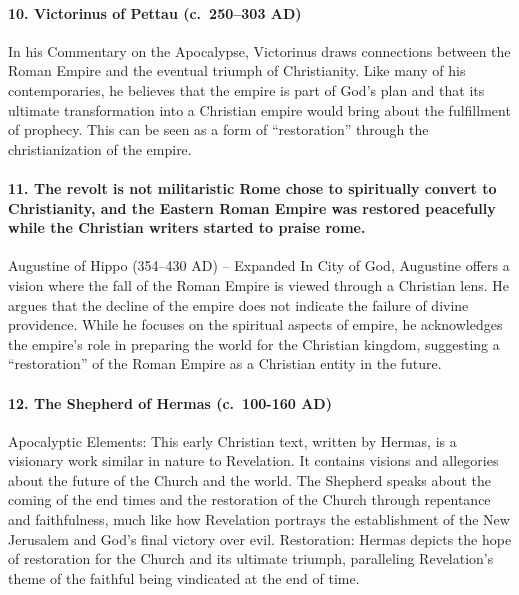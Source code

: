 \paragraph{10.
Victorinus of Pettau (c.~250--303 AD)}\label{par:victorinus-of-pettau-c.-250303-ad}

In his Commentary on the Apocalypse, Victorinus draws connections between the Roman Empire and the eventual triumph of Christianity.
Like many of his contemporaries, he believes that the empire is part of God's plan and that its ultimate transformation into a Christian empire would bring about the fulfillment of prophecy.
This can be seen as a form of ``restoration'' through the christianization of the empire.

\paragraph{11.
The revolt is not militaristic Rome chose to spiritually convert to Christianity, and the Eastern Roman Empire was restored peacefully while the Christian writers started to praise rome.}\label{par:the-revolt-is-not-militaristic-rome-chose-to-spiritually-convert-to-christianity-and-the-eastern-roman-empire-was-restored-peacefully-while-the-christian-writers-started-to-praise-rome.}

Augustine of Hippo (354--430 AD) -- Expanded In City of God, Augustine offers a vision where the fall of the Roman Empire is viewed through a Christian lens.
He argues that the decline of the empire does not indicate the failure of divine providence.
While he focuses on the spiritual aspects of empire, he acknowledges the empire's role in preparing the world for the Christian kingdom, suggesting a ``restoration'' of the Roman Empire as a Christian entity in the future.

\paragraph{12.
The Shepherd of Hermas (c.~100-160 AD)}\label{par:the-shepherd-of-hermas-c.-100-160-ad}

Apocalyptic Elements: This early Christian text, written by Hermas, is a visionary work similar in nature to Revelation.
It contains visions and allegories about the future of the Church and the world.
The Shepherd speaks about the coming of the end times and the restoration of the Church through repentance and faithfulness, much like how Revelation portrays the establishment of the New Jerusalem and God's final victory over evil.
Restoration: Hermas depicts the hope of restoration for the Church and its ultimate triumph, paralleling Revelation's theme of the faithful being vindicated at the end of time.

